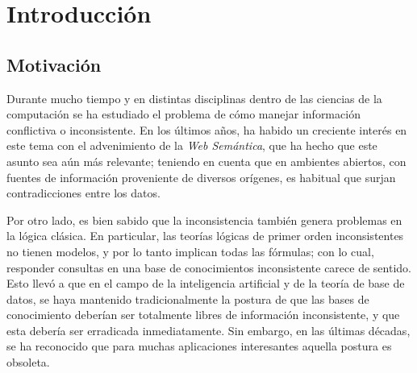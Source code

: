 \documentclass[11pt,a4paper,twoside]{tesis}
\begin{document}

\def\autor{Pablo Víctor Fromer}
\def\tituloTesis{Datalog +/-, \vspace{.2cm} \\ una interfaz tolerante a la inconsistencia }
\def\runtitulo{Datalog +/-, una interfaz tolerante a la inconsistencia}
\def\runtitle{Datalog +/-, una interfaz tolerante a la inconsistencia}
\def\director{María Vanina Martinez}
\def\codirector{Ricardo Oscar Rodriguez}
\def\lugar{Buenos Aires, 2019}


%




\cleardoublepage
\tableofcontents

\mainmatter
\pagestyle{headings}


\chapter{Introducción}
\section{Motivación}

Durante mucho tiempo y en distintas disciplinas dentro de las ciencias de la computación se ha estudiado el problema de cómo manejar información conflictiva o inconsistente. En los últimos años, ha habido un creciente interés en este tema con el advenimiento de la \textit{Web Semántica}, que ha hecho que este asunto sea aún más relevante; teniendo en cuenta que en ambientes abiertos, con fuentes de información proveniente de diversos orígenes, es habitual que surjan contradicciones entre los datos.

Por otro lado, es bien sabido que la inconsistencia también genera problemas en la lógica clásica. En particular, las teorías lógicas de primer orden inconsistentes no tienen modelos, y por lo tanto implican todas las fórmulas; con lo cual, responder consultas en una base de conocimientos inconsistente carece de sentido. Esto llevó a que en el campo de la inteligencia artificial y de la teoría de base de datos, se haya mantenido tradicionalmente la postura de que las bases de conocimiento deberían ser totalmente libres de información inconsistente, y que esta debería ser erradicada inmediatamente. Sin embargo, en las últimas décadas, se ha reconocido que para muchas aplicaciones interesantes aquella postura es obsoleta. 
\end{document}

